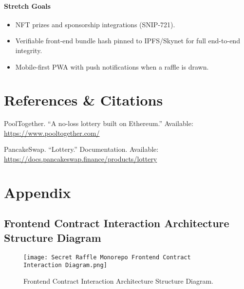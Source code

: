 \documentclass{article}
\begin{document}
\paragraph{Stretch Goals}
\begin{itemize}
  \item NFT prizes and sponsorship integrations (SNIP-721).
  \item Verifiable front-end bundle hash pinned to IPFS/Skynet for full end-to-end integrity.
  \item Mobile-first PWA with push notifications when a raffle is drawn.
\end{itemize}

\section{References \& Citations}
\begin{thebibliography}{9}

PoolTogether. ``A no-loss lottery built on Ethereum.'' Available: \url{https://www.pooltogether.com/}

PancakeSwap. ``Lottery.'' Documentation. Available: \url{https://docs.pancakeswap.finance/products/lottery}
\end{thebibliography}

\newpage

\section{Appendix}

\subsection{Frontend Contract Interaction Architecture Structure Diagram}
\begin{figure}[h]
  \vspace{-0.5cm}
  \hspace{-2cm}
  \texttt{[image: Secret Raffle Monorepo Frontend Contract Interaction Diagram.png]}
  \caption{Frontend Contract Interaction Architecture Structure Diagram.}
  \label{fig:Frontend Contract Interaction Architecture Structure Diagram Appendix}
\end{figure}
\end{document}
